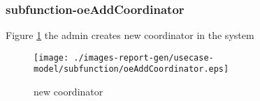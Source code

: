 \subsubsection{subfunction-oeAddCoordinator}

\label{RE-use-case-oeAddCoordinator}


Figure \ref{fig:lu.uni.lassy.excalibur.examples.icrash-RE-UCD-oeAddCoordinator}
 the admin creates new coordinator in the system

\begin{figure}[htbp]
\begin{center}

\texttt{[image: ./images-report-gen/usecase-model/subfunction/oeAddCoordinator.eps]}
\end{center}
\caption[lu.uni.lassy.excalibur.examples.icrash Use Case Diagram: oeAddCoordinator]{ new coordinator}
\label{fig:lu.uni.lassy.excalibur.examples.icrash-RE-UCD-oeAddCoordinator}
\end{figure}
\vspace{0.5cm}
